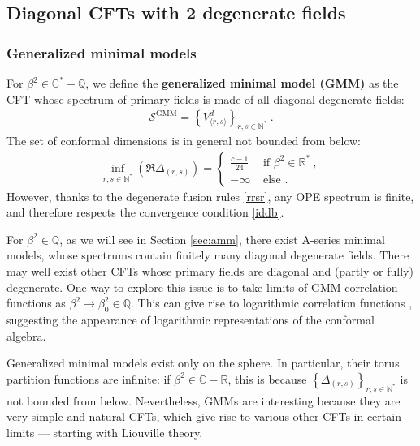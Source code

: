 \documentclass[12pt, a4paper]{article}
\theoremstyle{break}
\begin{document}
\subsection{Diagonal CFTs with 2 degenerate fields}\label{sec:diag}

\subsubsection{Generalized minimal models}\label{sec:gmm}

For $\beta^2\in\mathbb{C}^*-\mathbb{Q}$, we define the \textbf{generalized minimal model (GMM)} as the CFT whose spectrum of primary fields is made of all diagonal degenerate fields:
\begin{align}
 \boxed{\mathcal{S}^\text{GMM} = \left\{ V^d_{\langle r,s\rangle}\right\}_{r,s\in\mathbb{N}^*}} \ . 
\end{align}
The set of conformal dimensions is in general not bounded from below:
\begin{align}
 \inf_{r,s\in\mathbb{N}^*}\left(\Re\Delta_{(r,s)}\right) = \left\{\begin{array}{ll} \frac{c-1}{24} &\text{ if } \beta^2 \in \mathbb{R}^*\ , \\ -\infty & \text{ else }. \end{array}\right. 
\end{align}
However, thanks to the degenerate fusion rules \eqref{rrsr}, any OPE spectrum is finite, and therefore respects the convergence condition \eqref{iddb}.

For $\beta^2\in \mathbb{Q}$, as we will see in Section \ref{sec:amm}, there exist A-series minimal models, whose spectrums contain finitely many diagonal degenerate fields. There may well exist other CFTs whose primary fields are diagonal and (partly or fully) degenerate. One way to explore this issue is to take limits of GMM correlation functions as $\beta^2\to \beta^2_0\in \mathbb{Q}$. This can give rise to logarithmic correlation functions \cite{rib18}, suggesting the appearance of logarithmic representations of the conformal algebra. 

Generalized minimal models exist only on the sphere. In particular, their torus partition functions are infinite: if $\beta^2\in\mathbb{C}-\mathbb{R}$, this is because $\left\{ \Delta_{(r,s)}\right\}_{r,s\in\mathbb{N}^*}$ is not bounded from below. Nevertheless, GMMs are interesting because they are very simple and natural CFTs, which give rise to various other CFTs in certain limits --- starting with Liouville theory.
\end{document}
